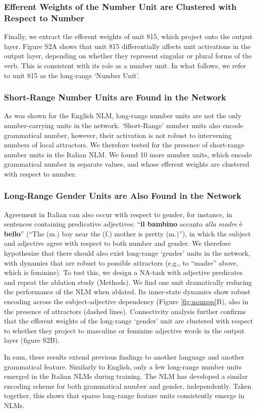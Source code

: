 \subsubsection{Efferent Weights of the Number Unit are Clustered with Respect to Number}
Finally, we extract the efferent weights of unit 815, which project onto the output layer. Figure S2A shows that unit 815 differentially affects unit activations in the output layer, depending on whether they represent singular or plural forms of the verb. This is consistent with its role as a number unit. In what follows, we refer to unit 815 as the long-range `Number Unit'.

\subsubsection{Short-Range Number Units are Found in the Network}
As was shown for the English NLM, long-range number units are not the only number-carrying units in the network. `Short-Range' number units also encode grammatical number, however, their activation is not robust to intervening numbers of local attractors. We therefore tested for the presence of short-range number units in the Italian NLM. We found 10 more number units, which encode grammatical number in separate values, and whose efferent weights are clustered with respect to number.

\subsubsection{Long-Range Gender Units are Also Found in the Network }
Agreement in Italian can also occur with respect to gender, for instance, in sentences containing predicative adjectives: ``\textbf{il bambino} accanto \emph{alla madre} \`{e} \textbf{bello}'' (``The (m.) boy near the (f.) mother is pretty (m.)''), in which the subject and adjective agree with respect to both number and gender. We therefore hypothesize that there should also exist long-range `gender' units in the network, with dynamics that are robust to possible attractors (e.g., to ``madre'' above, which is feminine). 
To test this, we design a NA-task with adjective predicates and repeat the ablation study (Methods). 
We find one unit dramatically reducing the performance of the NLM when ablated. Its inner-state dynamics show robust encoding across the subject-adjective dependency (Figure \ref{fig:nounpp}B), also in the presence of attractors (dashed lines). Connectivity analysis further confirms that the efferent weights of the long-range `gender' unit are clustered with respect to whether they project to masculine or feminine adjective words in the output layer (figure S2B).



\vspace{10pt}
In sum, these results extend previous findings to another language and another grammatical feature. Similarly to English, only a few long-range number units emerged in the Italian NLMs during training. The NLM has developed a similar encoding scheme for both grammatical number and gender, independently. Taken together, this shows that sparse long-range feature units consistently emerge in NLMs.




